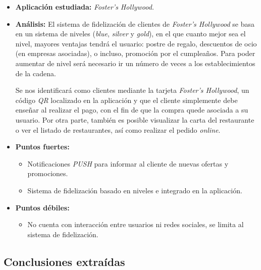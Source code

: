 \documentclass[twoside]{report}
\begin{document}
\begin{itemize}
\item \textbf{Aplicación estudiada:} \cite{fostersh} \textit{Foster's Hollywood.}
\item \textbf{Análisis:} 
El sistema de fidelización de clientes de \textit{Foster's Hollywood} se basa en un sistema de niveles (\textit{blue}, \textit{silver} y \textit{gold}), en el que cuanto mejor sea el nivel, mayores ventajas tendrá el usuario: postre de regalo, descuentos de ocio (en empresas asociadas), o incluso, promoción por el cumpleaños. Para poder aumentar de nivel será necesario ir un número de veces a los establecimientos de la cadena. 

Se nos identificará como clientes mediante la tarjeta \textit{Foster's Hollywood}, un código \textit{QR} localizado en la aplicación y que el cliente simplemente debe enseñar al realizar el pago, con el fin de que la compra quede asociada a su usuario. Por otra parte, también es posible visualizar la carta del restaurante o ver el listado de restaurantes, así como realizar el pedido \textit{online}.
\item \textbf{Puntos fuertes:}
	\begin{itemize}
	\item Notificaciones \textit{PUSH} para informar al cliente de nuevas ofertas y promociones.
	\item Sistema de fidelización basado en niveles e integrado en la aplicación.
	\end{itemize}
\item \textbf{Puntos débiles:}
	\begin{itemize}
	\item No cuenta con interacción entre usuarios ni redes sociales, se limita al sistema de fidelización.
	\end{itemize}
\end{itemize}

\subsection{Conclusiones extraídas}
\end{document}
